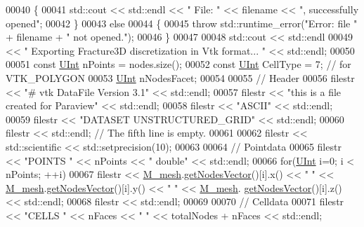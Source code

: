 \begin{DoxyCode}
00040     \{
00041         std::cout << std::endl << \textcolor{stringliteral}{" File: "} << filename << \textcolor{stringliteral}{", successfully opened"};
00042     \}
00043     \textcolor{keywordflow}{else}
00044     \{
00045         \textcolor{keywordflow}{throw} std::runtime\_error(\textcolor{stringliteral}{"Error: file "} + filename + \textcolor{stringliteral}{" not opened."});
00046     \}
00047 
00048     std::cout << std::endl
00049               << \textcolor{stringliteral}{" Exporting Fracture3D discretization in Vtk format... "} << std::endl;
00050 
00051     \textcolor{keyword}{const} \hyperlink{namespaceFVCode3D_a4bf7e328c75d0fd504050d040ebe9eda}{UInt} nPoints = nodes.size();
00052     \textcolor{keyword}{const} \hyperlink{namespaceFVCode3D_a4bf7e328c75d0fd504050d040ebe9eda}{UInt} CellType = 7; \textcolor{comment}{// for VTK\_POLYGON}
00053     \hyperlink{namespaceFVCode3D_a4bf7e328c75d0fd504050d040ebe9eda}{UInt} nNodesFacet;
00054 
00055     \textcolor{comment}{// Header}
00056     filestr << \textcolor{stringliteral}{"# vtk DataFile Version 3.1"} << std::endl;
00057     filestr << \textcolor{stringliteral}{"this is a file created for Paraview"} << std::endl;
00058     filestr << \textcolor{stringliteral}{"ASCII"} << std::endl;
00059     filestr << \textcolor{stringliteral}{"DATASET UNSTRUCTURED\_GRID"} << std::endl;
00060     filestr << std::endl;   \textcolor{comment}{// The fifth line is empty.}
00061 
00062     filestr << std::scientific << std::setprecision(10);
00063 
00064     \textcolor{comment}{// Pointdata}
00065     filestr << \textcolor{stringliteral}{"POINTS "} << nPoints << \textcolor{stringliteral}{" double"} << std::endl;
00066     \textcolor{keywordflow}{for}(\hyperlink{namespaceFVCode3D_a4bf7e328c75d0fd504050d040ebe9eda}{UInt} i=0; i < nPoints; ++i)
00067         filestr << \hyperlink{classFVCode3D_1_1Fracture3D_ab3ceda8a7f2e67ee5d94a08be2ba2977}{M\_mesh}.\hyperlink{classFVCode3D_1_1Mesh3D_a04162ec60e0fe52674b3ecbb7de1185c}{getNodesVector}()[i].x() << \textcolor{stringliteral}{" "} << 
      \hyperlink{classFVCode3D_1_1Fracture3D_ab3ceda8a7f2e67ee5d94a08be2ba2977}{M\_mesh}.\hyperlink{classFVCode3D_1_1Mesh3D_a04162ec60e0fe52674b3ecbb7de1185c}{getNodesVector}()[i].y() << \textcolor{stringliteral}{" "} << \hyperlink{classFVCode3D_1_1Fracture3D_ab3ceda8a7f2e67ee5d94a08be2ba2977}{M\_mesh}.
      \hyperlink{classFVCode3D_1_1Mesh3D_a04162ec60e0fe52674b3ecbb7de1185c}{getNodesVector}()[i].z() << std::endl;
00068     filestr << std::endl;
00069 
00070     \textcolor{comment}{// Celldata}
00071     filestr << \textcolor{stringliteral}{"CELLS "} << nFaces << \textcolor{stringliteral}{" "} << totalNodes + nFaces << std::endl;

\end{DoxyCode}
